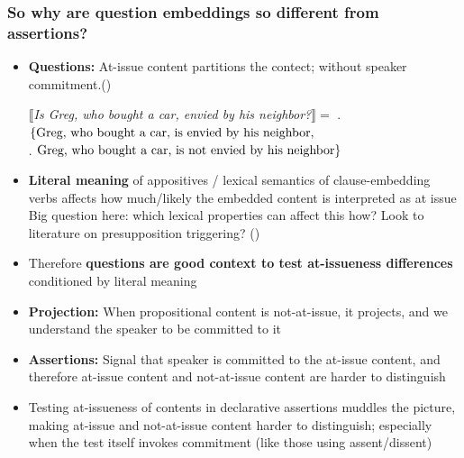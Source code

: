 \documentclass[compress, xcolor = dvipsnames, aspectratio=169]{beamer}
\begin{document}
	\begin{frame}[t]\frametitle{So why are question embeddings so different from assertions?}\scriptsize 
		\begin{itemize}[<+->]
			\item \textbf{Questions:} At-issue content partitions the contect; without speaker commitment\newline \phantom.\hfill {\scriptsize(\citealt{groenendijk_studies_1984,ginzburg_interrogatives_1996,roberts_information_1996,tonhauser_how_2018})}\smallskip

			$\llbracket$\emph{Is Greg, who bought a car, envied by his neighbor?}$\rrbracket =$
			\phantom. \hfill $\{\textnormal{Greg, who bought a car, is envied by his neighbor},$\\
			\phantom. \hfill$\textnormal{Greg, who bought a car, is not envied by his neighbor}\}$\medskip

			\item \textbf{Literal meaning} of appositives / lexical semantics of clause-embedding verbs affects how much/likely the embedded content is interpreted as at issue\smallskip\\ 
			{\scriptsize Big question here: which lexical properties can affect this how? Look to literature on presupposition triggering? (\citealt{abrusan_predicting_2011,schlenker_triggering_2021,anand_facts_2024,scontras_projection_2025})}\medskip

			\item Therefore \textbf{questions are good context to test at-issueness differences} conditioned by literal meaning\medskip

			\item \textbf{Projection:} When propositional content is not-at-issue, it projects, and we understand the speaker to be committed to it\medskip

			\item \textbf{Assertions:} Signal that speaker is committed to the at-issue content, and therefore at-issue content and not-at-issue content are harder to distinguish\medskip

			\item Testing at-issueness of contents in declarative assertions muddles the picture, making at-issue and not-at-issue content harder to distinguish; especially when the test itself invokes commitment (like those using assent/dissent)

		\end{itemize}
	
	\end{frame}
	
\end{document}
